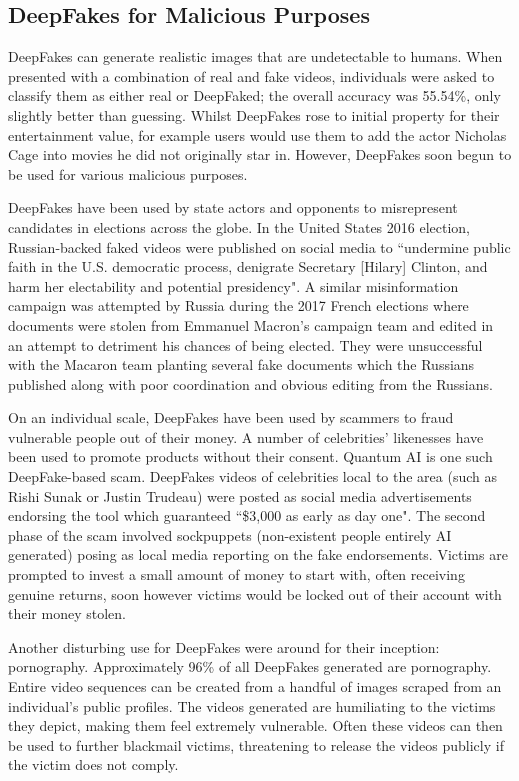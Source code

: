 \subsection{DeepFakes for Malicious Purposes}
\label{sec:mal-deepfakes}

DeepFakes can generate realistic images that are undetectable to humans. When presented with a combination of real and fake videos, individuals were asked to classify them as either real or DeepFaked; the overall accuracy was 55.54\%\cite{diel2024human}, only slightly better than guessing. Whilst DeepFakes rose to initial property for their entertainment value, for example users would use them to add the actor Nicholas Cage into movies he did not originally star in\cite{harris2023deep}. However, DeepFakes soon begun to be used for various malicious purposes.

DeepFakes have been used by state actors and opponents to misrepresent candidates in elections across the globe. In the United States 2016 election, Russian-backed faked videos were published on social media to ``undermine public faith in the U.S. democratic process, denigrate Secretary [Hilary] Clinton, and harm her electability and potential presidency"\cite{harris2023deep}. A similar misinformation campaign was attempted by Russia during the 2017 French elections where documents were stolen from Emmanuel Macron's campaign team and edited in an attempt to detriment his chances of being elected\cite{chesney2019deep}. They were unsuccessful with the Macaron team planting several fake documents which the Russians published along with poor coordination and obvious editing from the Russians. 

On an individual scale, DeepFakes have been used by scammers to fraud vulnerable people out of their money. A number of celebrities' likenesses have been used to promote products without their consent. Quantum AI is one such DeepFake-based scam\cite{sensity2024state}. DeepFakes videos of celebrities local to the area (such as Rishi Sunak or Justin Trudeau) were posted as social media advertisements endorsing the tool which guaranteed ``\$3,000 as early as day one". The second phase of the scam involved sockpuppets (non-existent people entirely AI generated) posing as local media reporting on the fake endorsements. Victims are prompted to invest a small amount of money to start with, often receiving genuine returns, soon however victims would be locked out of their account with their money stolen.

Another disturbing use for DeepFakes were around for their inception: pornography. Approximately 96\% of all DeepFakes generated are pornography\cite{ajder2019state}. Entire video sequences can be created from a handful of images scraped from an individual's public profiles\cite{chesney2019deep}. The videos generated are humiliating to the victims they depict, making them feel extremely vulnerable. Often these videos can then be used to further blackmail victims, threatening to release the videos publicly if the victim does not comply.

